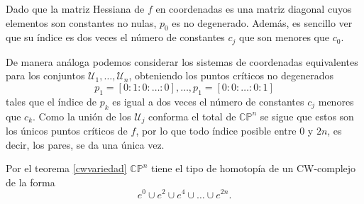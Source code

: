 Dado que la matriz Hessiana de $f$ en coordenadas es una matriz diagonal cuyos elementos son constantes no nulas, $p_0$ es no degenerado. Además, es sencillo ver que su índice es dos veces el número de constantes $c_j$ que son menores que $c_0$.

De manera análoga podemos considerar los sistemas de coordenadas equivalentes para los conjuntos $\mathcal{U}_1, \dots, \mathcal{U}_n$, obteniendo los puntos críticos no degenerados
\begin{equation*}
    p_1 = [0:1:0:\dots:0], \dots, p_1 = [0:0:\dots:0:1]
\end{equation*}
tales que el índice de $p_k$ es igual a dos veces el número de constantes $c_j$ menores que $c_k$. Como la unión de los $\mathcal{U}_j$ conforma el total de $\mathbb{CP}^n$ se sigue que estos son los únicos puntos críticos de $f$, por lo que todo índice posible entre $0$ y $2n$, es decir, los pares, se da una única vez.

Por el teorema \ref{cwvariedad} $\mathbb{CP}^n$ tiene el tipo de homotopía de un CW-complejo de la forma
\begin{equation*}
    e^0\cup e^2 \cup e^4 \cup \dots \cup e^{2n}.
\end{equation*}
